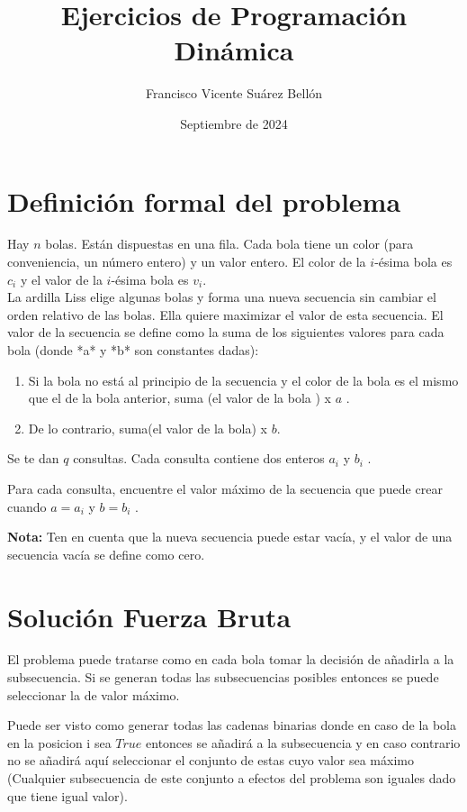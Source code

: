\documentclass{article}
\title{Ejercicios de Programación Dinámica}
\author{Francisco Vicente Suárez Bellón}
\date{Septiembre de 2024}
\begin{document}
\maketitle
\pagebreak
\section*{Definición formal del problema}
Hay $n$ bolas. Están dispuestas en una fila. Cada bola tiene un color (para conveniencia, un número entero) y un valor entero. El color de la $i$-ésima
bola es $c_i$ y el valor de la $i$-ésima bola es $v_i$.\\
La ardilla Liss elige algunas bolas y forma una nueva secuencia sin cambiar el orden relativo de las bolas. Ella quiere maximizar el valor de esta secuencia.
El valor de la secuencia se define como la suma de los siguientes valores para cada bola (donde *a* y *b* son constantes dadas): 
\begin{enumerate}
    \item Si la bola no está al principio de la secuencia y el color de la bola es el mismo que el de la bola anterior, suma (el valor de la bola ) x $a$ .
    \item De lo contrario, suma(el valor de la bola) x $b$.
\end{enumerate}


Se te dan $q$ consultas. Cada consulta contiene dos enteros $a_i$ y $b_i$ .

Para cada consulta, encuentre el valor máximo de la secuencia que puede crear cuando $a=a_i$ y $b=b_i$ .

\textbf{Nota:} Ten en cuenta que la nueva secuencia puede estar vacía, y el valor de una secuencia vacía se define como cero.


\pagebreak

\section*{Solución Fuerza Bruta}
El problema puede tratarse como en cada bola tomar la decisión de añadirla a la subsecuencia. Si se generan todas las subsecuencias posibles entonces
se puede seleccionar la de valor máximo.

Puede ser visto como generar todas las cadenas binarias donde en caso de la bola en la posicion i sea $True$ entonces se añadirá a la subsecuencia y en caso contrario no se añadirá
aquí seleccionar el conjunto de estas cuyo valor sea máximo (Cualquier subsecuencia de este conjunto a efectos del problema son iguales dado que tiene igual valor).
\end{document}
